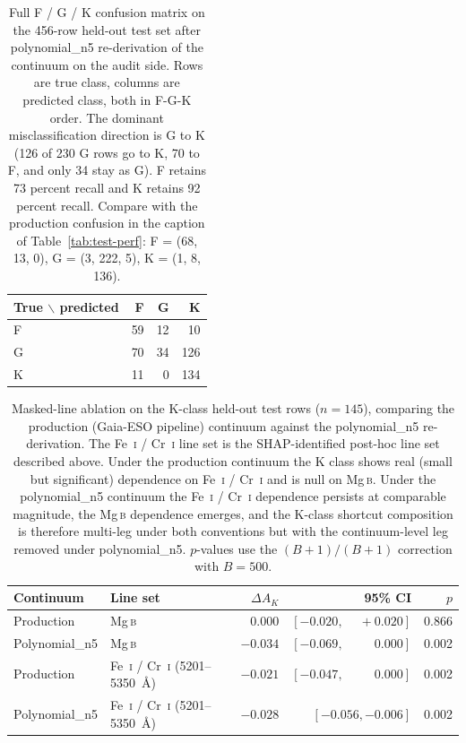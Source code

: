 \documentclass[11pt,a4paper]{article}
\newcommand{\Mgb}{Mg\,\textsc{b}\xspace}
\newcommand{\dA}{\Delta A}
\begin{document}
\begin{table}[ht]
\centering
\caption{Full F / G / K confusion matrix on the 456-row held-out test set after polynomial\_n5 re-derivation of the continuum on the audit side. Rows are true class, columns are predicted class, both in F-G-K order. The dominant misclassification direction is G to K (126 of 230 G rows go to K, 70 to F, and only 34 stay as G). F retains 73 percent recall and K retains 92 percent recall. Compare with the production confusion in the caption of Table~\ref{tab:test-perf}: F = (68, 13, 0), G = (3, 222, 5), K = (1, 8, 136).}
\label{tab:a2_confusion}
\begin{tabular}{lrrr}
\toprule
True $\backslash$ predicted & F & G & K \\
\midrule
F & 59 & 12 &  10 \\
G & 70 & 34 & 126 \\
K & 11 &  0 & 134 \\
\bottomrule
\end{tabular}
\end{table}

\begin{table}[ht]
\centering
\caption{Masked-line ablation on the K-class held-out test rows ($n = 145$), comparing the production (Gaia-ESO pipeline) continuum against the polynomial\_n5 re-derivation. The Fe~\textsc{i} / Cr~\textsc{i} line set is the SHAP-identified post-hoc line set described above. Under the production continuum the K class shows real (small but significant) dependence on Fe~\textsc{i} / Cr~\textsc{i} and is null on \Mgb. Under the polynomial\_n5 continuum the Fe~\textsc{i} / Cr~\textsc{i} dependence persists at comparable magnitude, the \Mgb dependence emerges, and the K-class shortcut composition is therefore multi-leg under both conventions but with the continuum-level leg removed under polynomial\_n5. $p$-values use the \citet{2010SAGMB...9...39P} $(B+1)/(B+1)$ correction with $B = 500$.}
\label{tab:a2_ablation}
\begin{tabular}{llrrr}
\toprule
Continuum & Line set & $\dA_K$ & 95\% CI & $p$ \\
\midrule
Production     & \Mgb                                          & $\phantom{-}0.000$ & $[-0.020, \phantom{-}+0.020]$ & 0.866 \\
Polynomial\_n5 & \Mgb                                          & $-0.034$           & $[-0.069, \phantom{-}\phantom{+}0.000]$ & 0.002 \\
\midrule
Production     & Fe~\textsc{i} / Cr~\textsc{i} (5201--5350~\AA{}) & $-0.021$ & $[-0.047, \phantom{-}\phantom{+}0.000]$ & 0.002 \\
Polynomial\_n5 & Fe~\textsc{i} / Cr~\textsc{i} (5201--5350~\AA{}) & $-0.028$ & $[-0.056, -0.006]$ & 0.002 \\
\bottomrule
\end{tabular}
\end{table}
\end{document}
